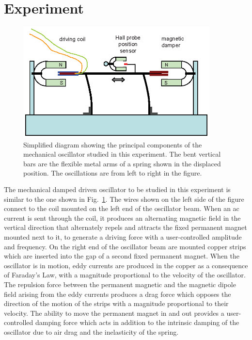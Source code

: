 \documentclass{revtex4}
\begin{document}
\section{Experiment}

\begin{figure}
\includegraphics[width=4in]{ddhosetup.eps}
\caption{\label{ddhosetup}
Simplified diagram showing the principal components of the mechanical
oscillator studied in this experiment.  The bent vertical bars are the
flexible metal arms of a spring shown in the displaced position.  The
oscillations are from left to right in the figure.}
\end{figure}

The mechanical damped driven oscillator to be studied in this experiment
is similar to the one shown in Fig.~\ref{ddhosetup}.  The wires shown on
the left side of the figure connect to the coil mounted on the left end
of the oscillator beam.  When an ac current is sent through the coil, it
produces an alternating magnetic field in the vertical direction that
alternately repels and attracts the fixed permanent magnet mounted next to
it, to generate a driving force with a user-controlled amplitude and
frequency.  On the right end of the oscillator beam are mounted copper
strips which are inserted into the gap of a second fixed permanent magnet.
When the oscillator is in motion, eddy currents are produced in the copper
as a consequence of Faraday's Law, with a magnitude proportional to the
velocity of the oscillator.  The repulsion force between the permanent
magnetic and the magnetic dipole field arising from the eddy currents 
produces a drag force which opposes the direction of the motion of the
strips with a magnitude proportional to their velocity.  The ability to
move the permanent magnet in and out provides a user-controlled damping
force which acts in addition to the intrinsic damping of the oscillator due
to air drag and the inelasticity of the spring.
\end{document}
